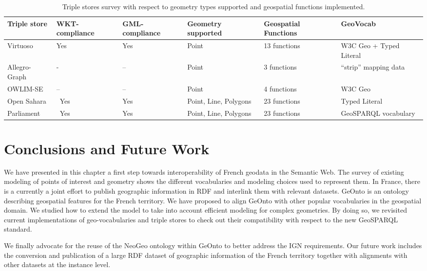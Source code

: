 \documentclass[a4paper,11pt]{report}
\begin{document}
\begin{table}
 \begin{tabularx}{\textwidth}{|X|X|X|X|X|l|}
 \hline
 \textbf{Triple store} & WKT-compliance & GML-compliance & Geometry supported  & Geospatial Functions & GeoVocab \\ \hline
 Virtuoso & Yes & Yes & Point & 13 functions & W3C Geo + Typed Literal  \\ \hline
 Allegro-Graph & \-- & -- & Point & 3 functions & ``strip'' mapping data \\ \hline
 OWLIM-SE & -- & -- & Point & 4 functions & W3C Geo\\ \hline
 Open Sahara & \ Yes & Yes & Point, Line, Polygons & 23 functions  & Typed Literal \\ \hline
 Parliament & \ Yes & Yes & Point, Line, Polygons & 23 functions  &  GeoSPARQL vocabulary\\ \hline
 \end{tabularx}
\caption{Triple stores survey with respect to geometry types supported and geospatial functions implemented.}
\label{tab:triplestore}
\end{table}



\section{Conclusions and Future Work}                                       \label{sec:conclusion}
We have presented in this chapter a first step towards interoperability of French geodata in the Semantic Web. The survey of existing modeling of points of interest and geometry shows the different vocabularies and modeling choices used to represent them. In France, there is a currently a joint effort to publish geographic information in RDF and interlink them with relevant datasets. GeOnto is an ontology describing geospatial features for the French territory. We have proposed to align GeOnto with other popular vocabularies in the geospatial domain. We studied how to extend the model to take into account efficient modeling for complex geometries. By doing so, we revisited current implementations of geo-vocabularies and triple stores to check out their compatibility with respect to the new GeoSPARQL standard.
 
We finally advocate for the reuse of the NeoGeo ontology within GeOnto to better address the IGN requirements. Our future work includes the conversion and publication of a large RDF dataset of geographic information of the French territory together with alignments with other datasets at the instance level.
\end{document}
